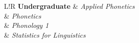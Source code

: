 \documentclass[a4paper,11pt]{article}
\newcommand\VRule{\color{lightgray}\vrule width 0.5pt}
\begin{document}
\begin{longtable}{L!{\VRule}R}
		\textbf{Undergraduate} & \textit{Applied Phonetics}\\
		& \textit{Phonetics}\\
		& \textit{Phonology 1}\\
		& \textit{Statistics for Linguistics}\\
	\end{longtable}
\end{document}
